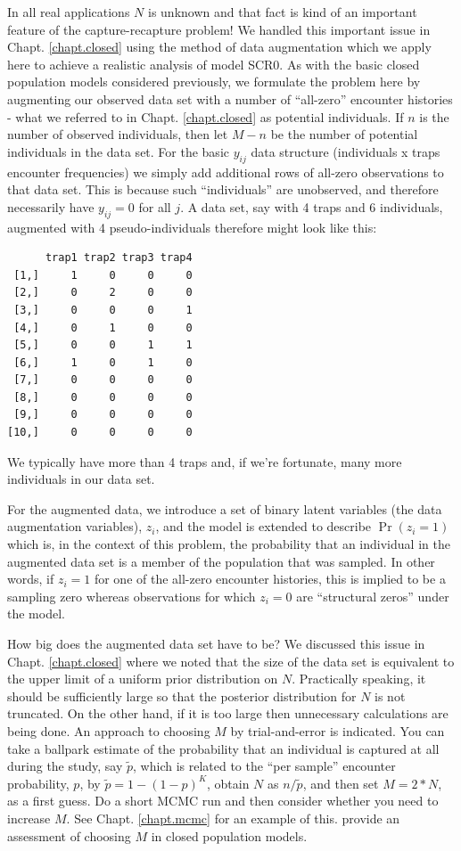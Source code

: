 In all real applications $N$ is unknown and that fact is kind of an
important feature of the capture-recapture problem!  We handled this
important issue in Chapt. \ref{chapt.closed} using the method of data augmentation
which we apply here to achieve a realistic analysis of model SCR0. As
with the basic closed population models considered previously, we
formulate the problem here by augmenting our observed data set with a
number of ``all-zero'' encounter histories - what we referred to in
Chapt. \ref{chapt.closed} as potential individuals. If $n$ is the number of observed
individuals, then let $M-n$ be the number of potential individuals in
the data set. For the basic $y_{ij}$ data structure (individuals x
traps encounter frequencies) we simply add additional rows of all-zero
observations to that data set. This is because such
``individuals'' are unobserved, and therefore necessarily have
$y_{ij}=0$ for all $j$.  A data set, say with 4 traps and 6 individuals,
augmented with 4 pseudo-individuals therefore might look like this:
{\small
\begin{verbatim}
      trap1 trap2 trap3 trap4
 [1,]     1     0     0     0
 [2,]     0     2     0     0
 [3,]     0     0     0     1
 [4,]     0     1     0     0
 [5,]     0     0     1     1
 [6,]     1     0     1     0
 [7,]     0     0     0     0
 [8,]     0     0     0     0
 [9,]     0     0     0     0
[10,]     0     0     0     0
\end{verbatim}
}
We typically have more than 4 traps and, if we're fortunate, many more
individuals in our data set.

For the augmented data, we introduce a set of binary latent variables
(the data augmentation variables), $z_{i}$, and the model is extended
to describe $\Pr(z_{i} = 1)$ which is, in the context of this problem,
the probability that an individual in the augmented data set is a
member of the population that was sampled. In other words, if $z_{i}=1$
for one of the all-zero encounter histories, this is implied to be
a sampling zero whereas observations for which $z_{i}=0$ are
``structural zeros'' under the model.

How big does the augmented data set have to be? We discussed this
issue in Chapt. \ref{chapt.closed} where we noted that the size of the
data set is equivalent to the upper limit of a uniform prior
distribution on $N$.  Practically speaking, it should be sufficiently
large so that the posterior distribution for $N$ is not truncated. On
the other hand, if it is too large then unnecessary calculations are
being done. An approach to choosing $M$ by trial-and-error is
indicated. You can take a ballpark estimate of the probability that an
individual is captured at all during the study, say $\tilde{p}$, which
is related to the ``per sample'' encounter probability, $p$, by
$\tilde{p} = 1-(1-p)^{K}$, obtain $N$ as $n/\tilde{p}$, and then set
$M = 2*N$, as a first guess. Do a short MCMC run and then consider
whether you need to increase $M$. See Chapt. \ref{chapt.mcmc} for an
example of this. \citet[][ch. 6]{kery_schaub:2011} provide an
assessment of choosing $M$ in closed population models.

